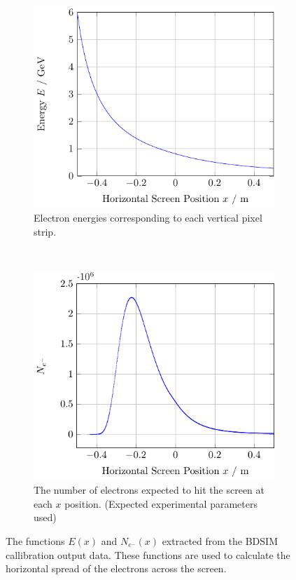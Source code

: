 \begin{figure}[!tb]
	\centering
	\begin{subfigure}[t]{\columnwidth}
		\includegraphics{./figures/eofx.pdf}
		\caption{
			Electron energies corresponding to each vertical pixel strip.
		}
		\label{fig:eofx}
	\end{subfigure}\hfill~
	\begin{subfigure}[t]{\columnwidth}
		\includegraphics{./figures/edist.pdf}
		\caption{
			The number of electrons expected to hit the screen at each \(x\)
			position. (Expected experimental parameters used)
		}
		\label{fig:edist}
	\end{subfigure}
	\caption{
		The functions \(E(x)\) and \(N_{e^-}(x)\) extracted from the BDSIM
		callibration output data. These functions are used to calculate the
		horizontal spread of the electrons across the screen.
	}
\end{figure}

